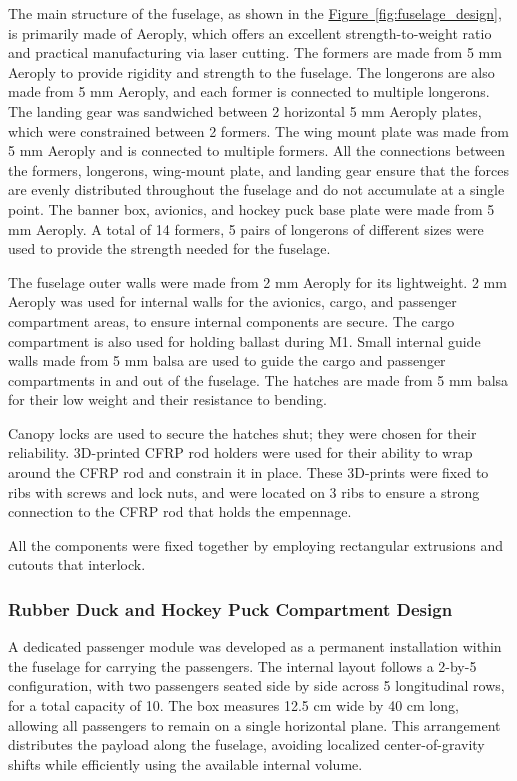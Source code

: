 \documentclass[10pt, letterpaper]{article}
\begin{document}
   The main structure of the fuselage, as shown in the \hyperref[fig:fuselage_design]{Figure~\ref*{fig:fuselage_design}}, is primarily made of Aeroply, which offers an excellent strength-to-weight ratio and practical manufacturing via laser cutting. The formers are made from 5 mm Aeroply to provide rigidity and strength to the fuselage. The longerons are also made from 5 mm Aeroply, and each former is connected to multiple longerons. The landing gear was sandwiched between 2 horizontal 5 mm Aeroply plates, which were constrained between 2 formers. The wing mount plate was made from 5 mm Aeroply and is connected to multiple formers. All the connections between the formers, longerons, wing-mount plate, and landing gear ensure that the forces are evenly distributed throughout the fuselage and do not accumulate at a single point. The banner box, avionics, and hockey puck base plate were made from 5 mm Aeroply. A total of 14 formers, 5 pairs of longerons of different sizes were used to provide the strength needed for the fuselage.

The fuselage outer walls were made from 2 mm Aeroply for its lightweight. 2 mm Aeroply was used for internal walls for the avionics, cargo, and passenger compartment areas, to ensure internal components are secure. The cargo compartment is also used for holding ballast during M1. Small internal guide walls made from 5 mm balsa are used to guide the cargo and passenger compartments in and out of the fuselage. The hatches are made from 5 mm balsa for their low weight and their resistance to bending.

Canopy locks are used to secure the hatches shut; they were chosen for their reliability. 3D-printed CFRP rod holders were used for their ability to wrap around the CFRP rod and constrain it in place. These 3D-prints were fixed to ribs with screws and lock nuts, and were located on 3 ribs to ensure a strong connection to the CFRP rod that holds the empennage.

All the components were fixed together by employing rectangular extrusions and cutouts that interlock.



\subsubsection{Rubber Duck and Hockey Puck Compartment Design}


A dedicated passenger module was developed as a permanent installation within the fuselage for carrying the passengers. The internal layout follows a 2-by-5 configuration, with two passengers seated side by side across 5 longitudinal rows, for a total capacity of 10. The box measures 12.5 cm wide by 40 cm long, allowing all passengers to remain on a single horizontal plane. This arrangement distributes the payload along the fuselage, avoiding localized center-of-gravity shifts while efficiently using the available internal volume.
\end{document}

